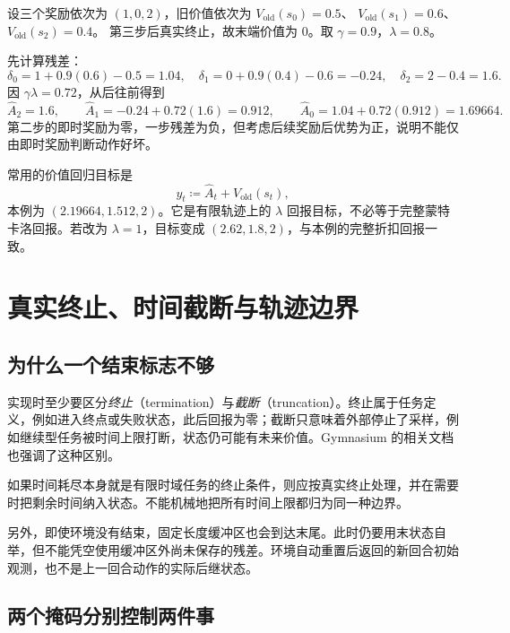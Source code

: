 \documentclass[UTF8,12pt,a4paper,fontset=fandol]{ctexart}
\begin{document}
\begin{example}
\label{ex:ppo-gae}
设三个奖励依次为 $(1,0,2)$，旧价值依次为
$V_{\mathrm{old}}(s_0)=0.5$、
$V_{\mathrm{old}}(s_1)=0.6$、
$V_{\mathrm{old}}(s_2)=0.4$。
第三步后真实终止，故末端价值为 $0$。取 $\gamma=0.9$，$\lambda=0.8$。
\end{example}
\begin{solve}
先计算残差：
\[
  \delta_0=1+0.9(0.6)-0.5=1.04,\quad
  \delta_1=0+0.9(0.4)-0.6=-0.24,\quad
  \delta_2=2-0.4=1.6.
\]
因 $\gamma\lambda=0.72$，从后往前得到
\[
  \widehat A_2=1.6,\qquad
  \widehat A_1=-0.24+0.72(1.6)=0.912,\qquad
  \widehat A_0=1.04+0.72(0.912)=1.69664.
\]
第二步的即时奖励为零，一步残差为负，但考虑后续奖励后优势为正，说明不能仅由即时奖励判断动作好坏。

常用的价值回归目标是
\begin{equation}
  y_t\coloneqq\widehat A_t+V_{\mathrm{old}}(s_t),
  \label{eq:ppo-value-target}
\end{equation}
本例为 $(2.19664,1.512,2)$。它是有限轨迹上的 $\lambda$ 回报目标，不必等于完整蒙特卡洛回报。若改为 $\lambda=1$，目标变成 $(2.62,1.8,2)$，与本例的完整折扣回报一致。
\end{solve}

\section{真实终止、时间截断与轨迹边界}
\label{sec:ppo-boundaries}

\subsection{为什么一个结束标志不够}

实现时至少要区分\emph{终止}（termination）与\emph{截断}（truncation）。终止属于任务定义，例如进入终点或失败状态，此后回报为零；截断只意味着外部停止了采样，例如继续型任务被时间上限打断，状态仍可能有未来价值。Gymnasium 的相关文档也强调了这种区别\cite{gymnasium-time-limits}。

如果时间耗尽本身就是有限时域任务的终止条件，则应按真实终止处理，并在需要时把剩余时间纳入状态。不能机械地把所有时间上限都归为同一种边界。

另外，即使环境没有结束，固定长度缓冲区也会到达末尾。此时仍要用末状态自举，但不能凭空使用缓冲区外尚未保存的残差。环境自动重置后返回的新回合初始观测，也不是上一回合动作的实际后继状态。

\subsection{两个掩码分别控制两件事}
\end{document}
